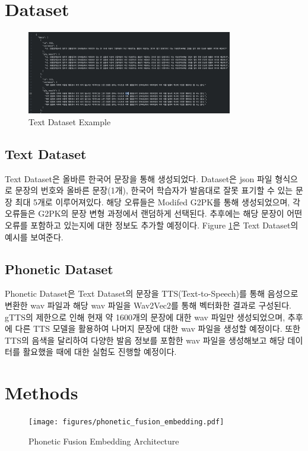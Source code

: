 \documentclass[letterpaper]{article} %
\begin{document}
\section{Dataset}
\begin{figure}[ht]
    \centering
    \includegraphics[width=0.8\textwidth]{figures/text_dataset_example.png}
    \caption{Text Dataset Example}
    \label{fig:text_dataset_example}
\end{figure}
\subsection{Text Dataset}
Text Dataset은 올바른 한국어 문장을 통해 생성되었다. Dataset은 json 파일 형식으로 문장의 번호와 올바른 문장(1개), 한국어 학습자가 발음대로 잘못 표기할 수 있는 문장 최대 5개로 이루어져있다. 해당 오류들은 Modifed G2PK를 통해 생성되었으며, 각 오류들은 G2PK의 문장 변형 과정에서 랜덤하게 선택된다. 추후에는 해당 문장이 어떤 오류를 포함하고 있는지에 대한 정보도 추가할 예정이다. Figure \ref{fig:text_dataset_example}은 Text Dataset의 예시를 보여준다.



\subsection{Phonetic Dataset}
Phonetic Dataset은 Text Dataset의 문장을 TTS(Text-to-Speech)를 통해 음성으로 변환한 wav 파일과 해당 wav 파일을 Wav2Vec2를 통해 벡터화한 결과로 구성된다.
gTTS의 제한으로 인해 현재 약 1600개의 문장에 대한 wav 파일만 생성되었으며, 추후에 다른 TTS 모델을 활용하여 나머지 문장에 대한 wav 파일을 생성할 예정이다.
또한 TTS의 음색을 달리하여 다양한 발음 정보를 포함한 wav 파일을 생성해보고 해당 데이터를 활요했을 때에 대한 실험도 진행할 예정이다.

\section{Methods}

\begin{figure}[ht]
    \centering
    \texttt{[image: figures/phonetic\_fusion\_embedding.pdf]}
    \caption{Phonetic Fusion Embedding Architecture}
    \label{fig:phonetic_encoder}
\end{figure}
\end{document}

